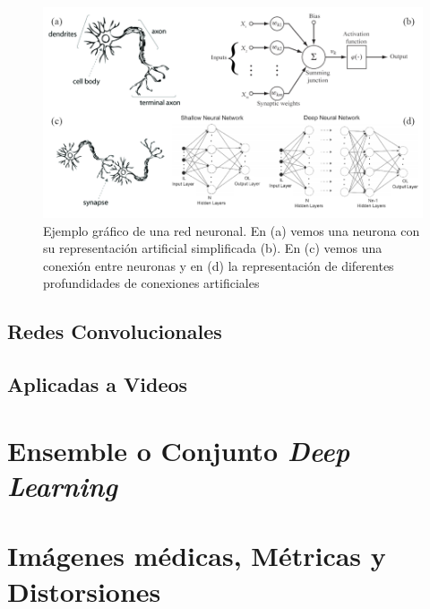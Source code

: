 \begin{figure}[htp]
  \centering
  \includegraphics[width=\textwidth]{imagenes/chapter2/ANNVisualization.png}
  \caption{Ejemplo gráfico de una red neuronal\cite{
    NeuronImages, NeuronSimilarity, ShallowAndDeepNN
    }. En (a) vemos una neurona con 
  su representación artificial simplificada (b). En (c) vemos una conexión entre 
  neuronas y en (d) la representación de diferentes profundidades de conexiones artificiales}
  \label{fig:ANNVisualization}
\end{figure}


\subsection{Redes Convolucionales} 
\subsection{Aplicadas a Videos} 
\section{Ensemble o Conjunto \emph{Deep Learning}}
\section{Imágenes médicas, Métricas y Distorsiones}
\label{sec:Distorsiones}
